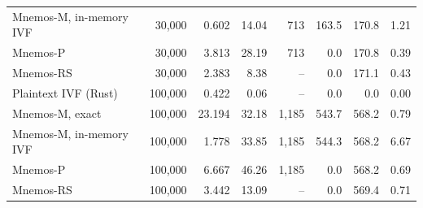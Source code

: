 \begin{table}[t]
\begin{tabular}{lrrrrrrr}
Mnemos-M, in-memory IVF & 30,000 & 0.602 & 14.04 & 713 & 163.5 & 170.8 & 1.21 \\
Mnemos-P & 30,000 & 3.813 & 28.19 & 713 & 0.0 & 170.8 & 0.39 \\
Mnemos-RS & 30,000 & 2.383 & 8.38 & -- & 0.0 & 171.1 & 0.43 \\
Plaintext IVF (Rust) & 100,000 & 0.422 & 0.06 & -- & 0.0 & 0.0 & 0.00 \\
Mnemos-M, exact & 100,000 & 23.194 & 32.18 & 1,185 & 543.7 & 568.2 & 0.79 \\
Mnemos-M, in-memory IVF & 100,000 & 1.778 & 33.85 & 1,185 & 544.3 & 568.2 & 6.67 \\
Mnemos-P & 100,000 & 6.667 & 46.26 & 1,185 & 0.0 & 568.2 & 0.69 \\
Mnemos-RS & 100,000 & 3.442 & 13.09 & -- & 0.0 & 569.4 & 0.71 \\
\bottomrule
\end{tabular}
\end{table}
